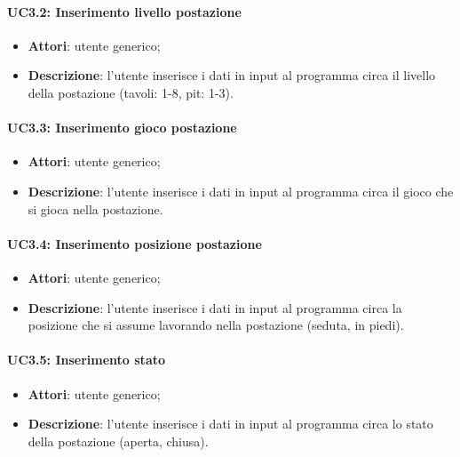 \paragraph{UC3.2: Inserimento livello postazione}
\begin{itemize}
    \item \textbf{Attori}: utente generico;
    \item \textbf{Descrizione}: l'utente inserisce i dati in input al programma circa il livello della postazione (tavoli: 1-8, pit: 1-3).
\end{itemize}
\paragraph{UC3.3: Inserimento gioco postazione}
\begin{itemize}
    \item \textbf{Attori}: utente generico;
    \item \textbf{Descrizione}: l'utente inserisce i dati in input al programma circa il gioco che si gioca nella postazione.
\end{itemize}
\paragraph{UC3.4: Inserimento posizione postazione}
\begin{itemize}
    \item \textbf{Attori}: utente generico;
    \item \textbf{Descrizione}: l'utente inserisce i dati in input al programma circa la posizione che si assume lavorando nella postazione (seduta, in piedi).
\end{itemize}
\paragraph{UC3.5: Inserimento stato}
\begin{itemize}
    \item \textbf{Attori}: utente generico;
    \item \textbf{Descrizione}: l'utente inserisce i dati in input al programma circa lo stato della postazione (aperta, chiusa).
\end{itemize}
